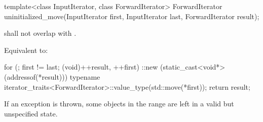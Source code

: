 %
\begin{itemdecl}
template<class InputIterator, class ForwardIterator>
  ForwardIterator uninitialized_move(InputIterator first, InputIterator last,
                                     ForwardIterator result);
\end{itemdecl}

\begin{itemdescr}
{\color{newclr}
\pnum
\expects
{} shall not overlap with .
} %

\pnum
\effects
Equivalent to:
\begin{codeblock}
for (; first != last; (void)++result, ++first)
  ::new (static_cast<void*>(addressof(*result)))
    typename iterator_traits<ForwardIterator>::value_type(std::move(*first));
return result;
\end{codeblock}

\pnum
\remarks
If an exception is thrown, some objects in the range 
are left in a valid but unspecified state.
\end{itemdescr}

